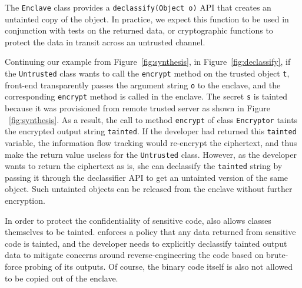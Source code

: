 The \systemname{} {\tt Enclave} class provides a {\tt declassify(Object o)} API that creates an untainted
copy of the object.  In practice, we expect this function to be used in conjunction with tests
on the returned data, or cryptographic functions to protect the data in transit across an untrusted channel.

Continuing our example from Figure~\ref{fig:synthesis}, in Figure~\ref{fig:declassify}, if the {\tt Untrusted} class wants to call the {\tt encrypt} method on the trusted object {\tt t}, \systemname{} front-end transparently passes the argument string {\tt o} to the enclave, and the corresponding {\tt encrypt} method is called in the enclave. The secret {\tt s} is tainted because it was provisioned from remote trusted server as shown in Figure ~\ref{fig:synthesis}. As a result, the call to method {\tt encrypt} of class {\tt Encryptor} taints the encrypted output string {\tt tainted}. If the developer had returned this {\tt tainted} variable, the \systemname{} information flow tracking would re-encrypt the ciphertext, and thus make the return value useless for the {\tt Untrusted} class. However, as the developer wants to return the ciphertext as is, she can declassify the {\tt tainted} string by passing it through the declassifier API to get an untainted version of the same object. Such untainted objects can be released from the enclave without further encryption.


In order to protect the confidentiality of sensitive code,
\systemname{} also allows classes themselves to be tainted.
\systemname{} enforces a policy that any data returned from sensitive code is tainted, and the developer needs to explicitly declassify tainted output data to mitigate
concerns around reverse-engineering the code based on brute-force probing of its outputs.
Of course, the binary code itself is also not allowed to be copied out of the enclave.


%
